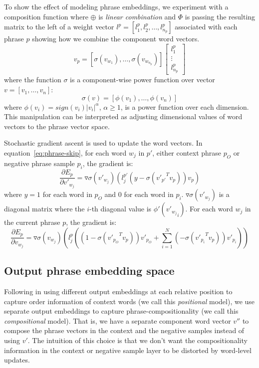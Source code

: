 To show the effect of modeling phrase embeddings, we experiment with a composition function where $\oplus$ is \textit{linear combination} and $\Phi$ is passing the resulting matrix to the left of a weight vector $l^p = [l_1^p , l_2^p, \ldots, l_{n_p}^p]$
associated with each phrase $p$ showing how we combine the component word vectors. 
\begin{equation}
\label{eq:linear}
v_p = [\sigma(v_{w_1}), \ldots, \sigma(v_{w_{n_p}})] \begin{bmatrix} l_1^p \\ \vdots\\ l_{n_p}^p \end{bmatrix}
\end{equation}
where the function $\sigma$ is a component-wise power function over vector $v=[v_1, \ldots, v_n]$:
\begin{equation}
    \sigma(v) = [\phi(v_1), \ldots, \phi(v_n)]
\end{equation}
where $\phi(v_i)=\textit{sign}(v_i)|v_i|^{\alpha}$, $\alpha\geq 1$, is a power function over each dimension. This manipulation can be interpreted as adjusting dimensional values of word vectors to the phrase vector space.


Stochastic gradient ascent is used to update the word vectors. In equation~\ref{eq:phrase-skip}, for each word $w_j$ in $p'$, either context phrase $p_O$ or negative 
phrase sample $p_i$, the gradient is:
\begin{equation}
    \frac{\partial E_p}{\partial v'_{w_j}} = \triangledown \sigma(v'_{w_j}) (l_j^{p'} (y-\sigma({v'_{p'}}^T v_p)) v_p) 
\end{equation}
where $y=1$ for each word in $p_O$ and 0 for each word in $p_i$. $\triangledown \sigma(v'_{w_j})$ is a diagonal matrix where the $i$-th diagonal value is $\phi'({v'_{w_j}}_i)$.
For each word $w_j$ in the current phrase $p$, the gradient is:
\begin{equation}
\frac{\partial E_p}{\partial v_{w_j}} = \triangledown \sigma(v_{w_j}) (l_j^{p} ((1-\sigma({v'_{p_O}}^T v_p)) v'_{p_O} + \sum_{i=1}^{N} (-\sigma({v'_{p_i}}^T v_p)) v'_{p_i})) 
\end{equation}
\subsection{Output phrase embedding space}
Following  in 
using different output embeddings at each relative position to capture order information of context words (we call this \textit{positional} model), 
we use separate output embeddings to capture phrase-compositionality (we call this \textit{compositional} model). That is, we have a separate component 
word vector $v''$ to compose the phrase vectors in the context 
and the negative samples instead of using $v'$.
The intuition of this choice is that we don't want the compositionality information in the context or negative sample layer 
to be distorted by word-level updates. 



